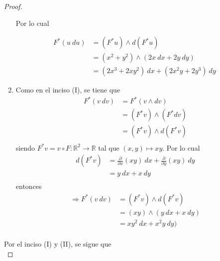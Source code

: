 \documentclass[12pt]{report}
\theoremstyle{largebreak}
\newcommand\cf[3]{\ensuremath{#1:#2\rightarrow#3}}
\begin{document}
\begin{proof}
\begin{enumerate}
            Por lo cual

            \begin{equation*}
                \begin{split}
                    F^*(u\:du)&=(F^*u)\wedge d(F^*u)\\
                    &=(x^2+y^2)\wedge(2x\:dx+2y\:dy)\\
                    &=(2x^3+2xy^2)\:dx+(2x^2y+2y^3)\:dy\
                \end{split}
            \end{equation*}
            
            \item Como en el inciso (I), se tiene que
            \begin{equation*}
                \begin{split}
                    F^*(v\: dv)&=F^*(v\wedge dv)\\
                    &=(F^*v)\wedge (F^*dv)\\
                    &=(F^*v)\wedge d(F^*v)\\
                \end{split}
            \end{equation*}
            siendo $F^*v=\cf{v\circ F}{\mathbb{R}^2}{\mathbb{R}}$ tal que $(x,y)\mapsto xy$. Por lo cual
            \begin{equation*}
                \begin{split}
                    d(F^*v)&=\frac{\partial}{\partial x}(xy)\:dx+\frac{\partial}{\partial y}(xy)\: dy\\
                    &=y\:dx+x\: dy\\
                \end{split}
            \end{equation*}
            entonces
            \begin{equation*}
                \begin{split}
                    \Rightarrow F^*(v\:dv)&=(F^*v)\wedge d(F^*v)\\
                    &=(xy)\wedge (y\:dx+x\: dy)\\
                    &=xy^2\:dx+x^2y\: dy)\\
                \end{split}
            \end{equation*}
        \end{enumerate}
        Por el inciso (I) y (II), se sigue que
        \begin{equation*}

\end{equation*}
\end{proof}
\end{document}
